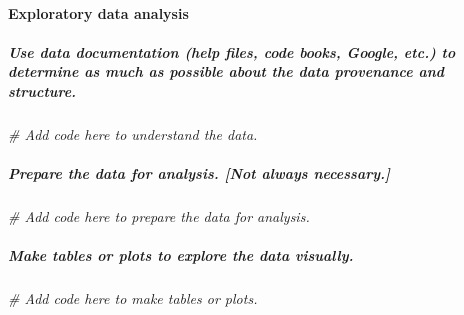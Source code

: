 \documentclass[
]{book}
\newenvironment{Shaded}{\begin{snugshade}}{\end{snugshade}}
\newcommand{\CommentTok}[1]{\textcolor[rgb]{0.56,0.35,0.01}{\textit{#1}}}
\begin{document}
\hypertarget{exploratory-data-analysis-1}{%
\paragraph*{Exploratory data analysis}\label{exploratory-data-analysis-1}}

\hypertarget{use-data-documentation-help-files-code-books-google-etc.-to-determine-as-much-as-possible-about-the-data-provenance-and-structure.-1}{%
\subparagraph*{Use data documentation (help files, code books, Google, etc.) to determine as much as possible about the data provenance and structure.}\label{use-data-documentation-help-files-code-books-google-etc.-to-determine-as-much-as-possible-about-the-data-provenance-and-structure.-1}}

\begin{Shaded}
\begin{Highlighting}[]
\CommentTok{\# Add code here to understand the data.}
\end{Highlighting}
\end{Shaded}

\hypertarget{prepare-the-data-for-analysis.-not-always-necessary.-1}{%
\subparagraph*{Prepare the data for analysis. {[}Not always necessary.{]}}\label{prepare-the-data-for-analysis.-not-always-necessary.-1}}

\begin{Shaded}
\begin{Highlighting}[]
\CommentTok{\# Add code here to prepare the data for analysis.}
\end{Highlighting}
\end{Shaded}

\hypertarget{make-tables-or-plots-to-explore-the-data-visually.-1}{%
\subparagraph*{Make tables or plots to explore the data visually.}\label{make-tables-or-plots-to-explore-the-data-visually.-1}}

\begin{Shaded}
\begin{Highlighting}[]
\CommentTok{\# Add code here to make tables or plots.}
\end{Highlighting}
\end{Shaded}
\end{document}
